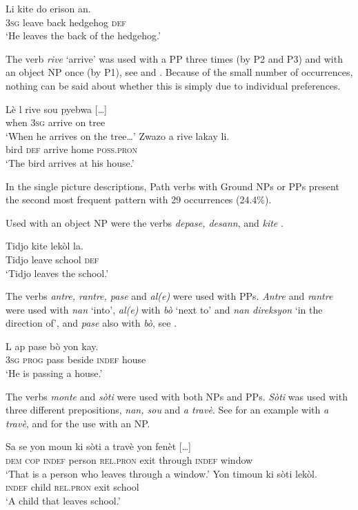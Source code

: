 \documentclass[output=paper,colorlinks,citecolor=brown]{langscibook}
\begin{document}
\ea\label{ex:3:38}
\gll  Li kite do erison an.\\
      \textsc{3sg} leave back hedgehog \textsc{def}\\
\glt ‘He leaves the back of the hedgehog.’
\z

The verb \emph{rive} ‘arrive’ was used with a PP three times (by P2 and P3) and with an object NP once (by P1), see  and . Because of the small number of occurrences, nothing can be said about whether this is simply due to individual preferences.

\ea\label{ex:3:39}
\gll  Lè l rive sou pyebwa {[}…{]} \\
      when \textsc{3sg} arrive on tree  \\
\glt ‘When he arrives on the tree…’
\ex\label{ex:3:40}
\gll    Zwazo a rive lakay li.\\
        bird \textsc{def} arrive home \textsc{poss.pron}\\
\glt ‘The bird arrives at his house.’
\z

In the single picture descriptions, Path verbs with Ground NPs or PPs present the second most frequent pattern with 29 occurrences (24.4\%).

Used with an object NP were the verbs \emph{depase, desann}, and \emph{kite} .

\ea\label{ex:3:41}
\gll  Tidjo kite lekòl la. \\
      Tidjo leave school \textsc{def}\\
\glt ‘Tidjo leaves the school.’
\z

The verbs \emph{antre, rantre, pase} and \emph{al(e)} were used with PPs. \emph{Antre} and \emph{rantre} were used with  \emph{nan} ‘into’, \emph{al(e)} with \emph{bò} ‘next to’ and \emph{nan direksyon} ‘in the direction of’, and \emph{pase} also with \emph{bò}, see .

\ea\label{ex:3:42}
\gll  L ap pase bò yon kay. \\
      \textsc{3sg} \textsc{prog} pass beside \textsc{indef} house \\
\glt ‘He is passing a house.’
\z

The verbs \emph{monte} and \emph{sòti} were used with both NPs and PPs. \emph{Sòti} was used with three different prepositions, \emph{nan, sou} and \emph{a travè}. See  for an example with \emph{a travè}, and  for the use with an NP.

\ea\label{ex:3:43}
\gll Sa se   yon   moun   ki       sòti {a travè} yon fenèt {[}…{]}\\
     \textsc{dem} \textsc{cop} \textsc{indef} person \textsc{rel.pron} exit through \textsc{indef} window\\
\glt ‘That is a person who leaves through a window.’ 
\ex\label{ex:3:44}
\gll    Yon timoun ki sòti lekòl. \\
        \textsc{indef} child \textsc{rel.pron} exit school \\
\glt ‘A child that leaves school.’
\z
\end{document}
